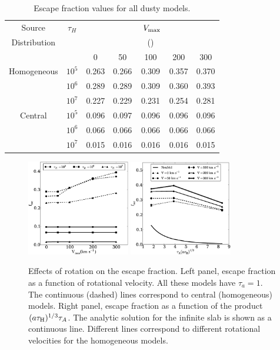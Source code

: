 \documentclass{emulateapj}
\newcommand{\kms}{{\ifmmode{{\mathrm{\,km\ s}^{-1}}}\else{\,km~s$^{-1}$}\fi}}
\begin{document}
\begin{table}
\begin{center}
\begin{tabular}{c ccc ccc}
\hline \hline
Source & $\tau_{H}$ & & & $\ V_{\rm max}$& & \\
Distribution& &  &  & (\kms) & & \\ 
& & 0 & 50 & 100 &200 & 300\\ \hline 
Homogeneous & $10^{5}$& 0.263 & 0.266 &  0.309 &  0.357 &  0.370  \\
           & $10^{6}$ & 0.289 &  0.289 &   0.309 &  0.360 &  0.393 \\
         &$10^{7}$ &  0.227 &  0.229 &  0.231 &  0.254 &  0.281 \\
Central & $10^{5}$ &  0.096 & 0.097 & 0.096 &  0.096 & 0.096 \\
  &$10^{6}$ & 0.066 & 0.066 &  0.066 &  0.066 &  0.066 \\
 &$10^{7}$ & 0.015 &  0.016 & 0.016 & 0.016 & 0.015 \\
\hline
\end{tabular}
\caption{
 Escape fraction values for all dusty models. } 
\label{table:escape}
\end{center}
\end{table}

\begin{figure}
\begin{center}
  \includegraphics[width=0.40\textwidth]{f6.eps}
  \includegraphics[width=0.40\textwidth]{f7.eps}
\end{center}
  \caption{Effects of rotation on the escape fraction. Left
    panel, escape fraction as a function of rotational velocity. All
    these models have $\tau_{a}=1$. The continuous (dashed) lines
    correspond to central (homogeneous) models. Right panel, escape
    fraction as a    function of the product $(a\tau_{\rm
      H})^{1/3}\tau_{A}$. The    analytic solution for the infinite
    slab is shown as a continuous    line. Different lines correspond
    to different rotational velocities for the homogeneous models.     
    \label{fig:efvsv}} 
\end{figure}
\end{document}
